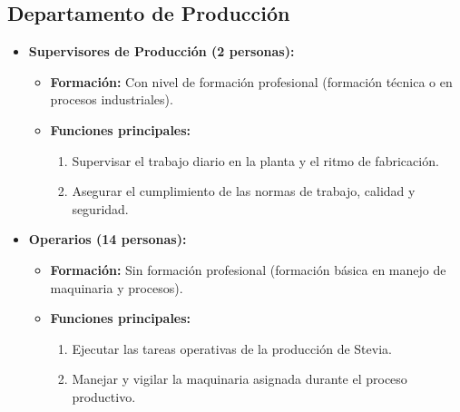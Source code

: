 \subsection{Departamento de Producción}
\begin{itemize}[leftmargin=*]
    \item \textbf{Supervisores de Producción (2 personas):}
          \begin{itemize}
              \item \textbf{Formación:} Con nivel de formación profesional (formación técnica o en procesos industriales).
              \item \textbf{Funciones principales:}
                    \begin{enumerate}
                        \item Supervisar el trabajo diario en la planta y el ritmo de fabricación.
                        \item Asegurar el cumplimiento de las normas de trabajo, calidad y seguridad.
                    \end{enumerate}
          \end{itemize}

    \item \textbf{Operarios (14 personas):}
          \begin{itemize}
              \item \textbf{Formación:} Sin formación profesional (formación básica en manejo de maquinaria y procesos).
              \item \textbf{Funciones principales:}
                    \begin{enumerate}
                        \item Ejecutar las tareas operativas de la producción de Stevia.
                        \item Manejar y vigilar la maquinaria asignada durante el proceso productivo.
                    \end{enumerate}
          \end{itemize}
\end{itemize}

